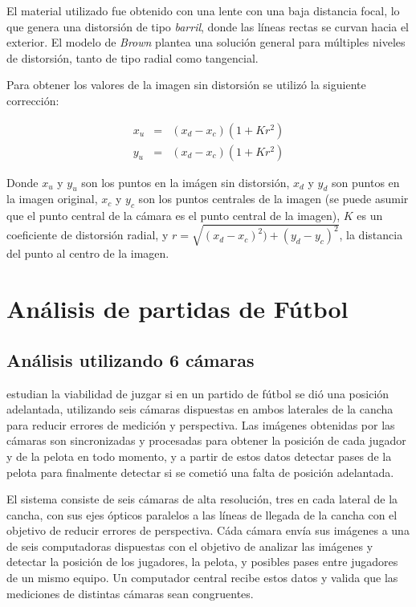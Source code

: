 \documentclass[a4paper,10pt]{article}
\begin{document}
El material utilizado fue obtenido con una lente con una baja distancia focal,
lo que genera una distorsión de tipo \textit{barril}, donde las líneas rectas
se curvan hacia el exterior. El modelo de \textit{Brown} plantea una solución
general para múltiples niveles de distorsión, tanto de tipo radial como
tangencial.

Para obtener los valores de la imagen sin distorsión se utilizó la siguiente
corrección:

\begin{eqnarray*}
    x_u &=& (x_d - x_c) (1+K r^2) \\
    y_u &=& (x_d - x_c) (1+K r^2)
\end{eqnarray*}

Donde $x_u$ y $y_u$ son los puntos en la imágen sin distorsión, $x_d$ y $y_d$ son
puntos en la imagen original, $x_c$ y $y_c$ son los puntos centrales de la
imagen (se puede asumir que el punto central de la cámara es el punto central
de la imagen), $K$ es un coeficiente de distorsión radial, y $r =
\sqrt{(x_d-x_c)^2) + (y_d-y_c)^2}$, la distancia del punto al centro de la
imagen.


\section{Análisis de partidas de Fútbol}
\label{sec:futbol}

\subsection{Análisis utilizando 6 cámaras}
\label{sec:6-camaras}

\citeauthor*{Tanos} estudian la viabilidad de juzgar si en un partido de fútbol
se dió una posición adelantada, utilizando seis cámaras dispuestas en ambos
laterales de la cancha para reducir errores de medición y perspectiva. Las
imágenes obtenidas por las cámaras son sincronizadas y procesadas para obtener
la posición de cada jugador y de la pelota en todo momento, y a partir de estos
datos detectar pases de la pelota para finalmente detectar si se cometió una
falta de posición adelantada.

El sistema consiste de seis cámaras de alta resolución, tres en cada lateral de
la cancha, con sus ejes ópticos paralelos a las líneas de llegada de la cancha
con el objetivo de reducir errores de perspectiva. Cáda cámara envía sus
imágenes a una de seis computadoras dispuestas con el objetivo de analizar las
imágenes y detectar la posición de los jugadores, la pelota, y posibles pases
entre jugadores de un mismo equipo. Un computador central recibe estos datos y
valida que las mediciones de distintas cámaras sean congruentes.
\end{document}
